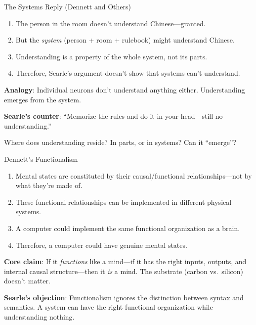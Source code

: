 ﻿\documentclass[aspectratio=169,11pt]{beamer}
\begin{document}
\begin{frame}{The Systems Reply (Dennett and Others)}
\begin{probox}
\small
\begin{enumerate}
    \item The person in the room doesn't understand Chinese---granted.
    \item But the \emph{system} (person + room + rulebook) might understand Chinese.
    \item Understanding is a property of the whole system, not its parts.
    \item Therefore, Searle's argument doesn't show that systems can't understand.
\end{enumerate}
\end{probox}

\vspace{0.1em}
\textbf{Analogy}: Individual neurons don't understand anything either. Understanding emerges from the system.

\vspace{0.1em}
\textbf{Searle's counter}: ``Memorize the rules and do it in your head---still no understanding.''

\vspace{0.1em}
\begin{discussionbox}[Discussion]
Where does understanding reside? In parts, or in systems? Can it ``emerge''?
\end{discussionbox}
\end{frame}

\begin{frame}{Dennett's Functionalism}
\begin{probox}
\small
\begin{enumerate}
    \item Mental states are constituted by their causal/functional relationships---not by what they're made of.
    \item These functional relationships can be implemented in different physical systems.
    \item A computer could implement the same functional organization as a brain.
    \item Therefore, a computer could have genuine mental states.
\end{enumerate}
\end{probox}

\vspace{0.2em}
\textbf{Core claim}: If it \emph{functions} like a mind---if it has the right inputs, outputs, and internal causal structure---then it \emph{is} a mind. The substrate (carbon vs.\ silicon) doesn't matter.

\vspace{0.2em}
\textbf{Searle's objection}: Functionalism ignores the distinction between syntax and semantics. A system can have the right functional organization while understanding nothing.
\end{frame}
\end{document}
